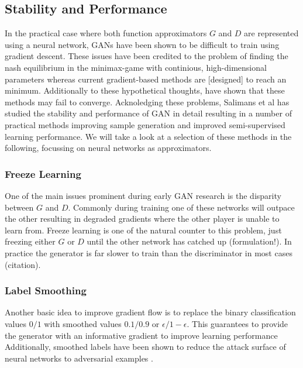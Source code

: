 \subsection{Stability and Performance}
\label{sub:gan_stability}
In the practical case where both function approximators $G$ and $D$ are represented using a neural network,
GANs have been shown to be difficult to train using gradient descent.
These issues have been credited to the problem of finding the nash equilibrium in the minimax-game with continious, high-dimensional parameters whereas current gradient-based methods are [designed] to reach an minimum.
Additionally to these hypothetical thoughts, \cite{gan_distinguish_crit:2014} have shown that these methods may fail to converge.
Acknoledging these problems, Salimans et al \cite{improved_gan:2016} has studied the stability and performance of GAN in detail resulting in a number of practical methods improving sample generation and improved semi-supervised learning performance.
We will take a look at a selection of these methods in the following, focussing on neural networks as approximators.

\subsubsection{Freeze Learning}
\label{ssub:gan_freeze_learning}
One of the main issues prominent during early GAN research is the disparity between $G$ and $D$.
Commonly during training one of these networks will outpace the other resulting in degraded gradients where the other player is unable to learn from.
Freeze learning is one of the natural counter to this problem, just freezing either $G$ or $D$ until the other network has catched up (formulation!).
In practice the generator is far slower to train than the discriminator in most cases (citation).


\subsubsection{Label Smoothing}
\label{ssub:gan_label_smoothing}
Another basic idea to improve gradient flow is to replace the binary classification values $0/1$ with smoothed values $0.1/0.9$ or $\epsilon/1-\epsilon$.
This guarantees to provide the generator with an informative gradient to improve learning performance
Additionally, smoothed labels have been shown to reduce the attack surface of neural networks to adversarial examples \cite{adv_examples:2016}.


